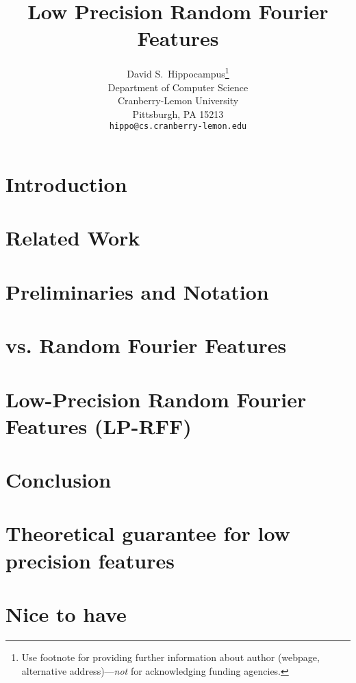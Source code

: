 \documentclass{article}
\title{Low Precision Random Fourier Features}
\author{
  David S.~Hippocampus\thanks{Use footnote for providing further
    information about author (webpage, alternative
    address)---\emph{not} for acknowledging funding agencies.} \\
  Department of Computer Science\\
  Cranberry-Lemon University\\
  Pittsburgh, PA 15213 \\
  \texttt{hippo@cs.cranberry-lemon.edu} \\
}
\begin{document}

\maketitle

\begin{abstract}

\end{abstract}

\section{Introduction}
\label{sec:intro}


\section{Related Work}
\label{sec:relwork}


\section{Preliminaries and Notation}
\label{sec:prelim}


\section{\Nystrom vs. Random Fourier Features}
\label{sec:nystromvsrff}


\section{Low-Precision Random Fourier Features (LP-RFF)}
\label{sec:lprff}


\section{Conclusion}
\label{sec:conclusion}




%

%

\clearpage

\appendix

\section{Theoretical guarantee for low precision features}
\label{sec:lprff_theory}


\section{Nice to have}
\label{sec:nicetohave}

\end{document}
